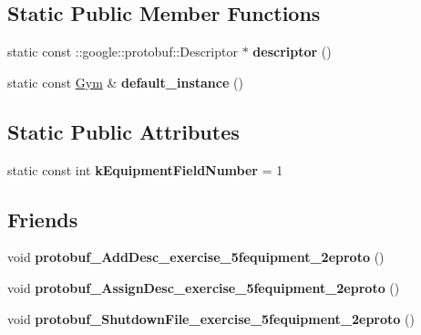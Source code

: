 \subsection*{Static Public Member Functions}
\begin{DoxyCompactItemize}
\item 
\hypertarget{classexercise__protobuf_1_1_gym_ac3a0e2edcb27d960aa09da71d74f0c43}{}static const \+::google\+::protobuf\+::\+Descriptor $\ast$ {\bfseries descriptor} ()\label{classexercise__protobuf_1_1_gym_ac3a0e2edcb27d960aa09da71d74f0c43}

\item 
\hypertarget{classexercise__protobuf_1_1_gym_a9d3d5d9ac43665f3bee33cc4ae542af3}{}static const \hyperlink{classexercise__protobuf_1_1_gym}{Gym} \& {\bfseries default\+\_\+instance} ()\label{classexercise__protobuf_1_1_gym_a9d3d5d9ac43665f3bee33cc4ae542af3}

\end{DoxyCompactItemize}
\subsection*{Static Public Attributes}
\begin{DoxyCompactItemize}
\item 
\hypertarget{classexercise__protobuf_1_1_gym_a9270b9f9ad0f94f6b18086a8f64be4a0}{}static const int {\bfseries k\+Equipment\+Field\+Number} = 1\label{classexercise__protobuf_1_1_gym_a9270b9f9ad0f94f6b18086a8f64be4a0}

\end{DoxyCompactItemize}
\subsection*{Friends}
\begin{DoxyCompactItemize}
\item 
\hypertarget{classexercise__protobuf_1_1_gym_ab643513d59abee7e930172a51104e178}{}void {\bfseries protobuf\+\_\+\+Add\+Desc\+\_\+exercise\+\_\+5fequipment\+\_\+2eproto} ()\label{classexercise__protobuf_1_1_gym_ab643513d59abee7e930172a51104e178}

\item 
\hypertarget{classexercise__protobuf_1_1_gym_aa2ddf289362adb3ea15b10dee7c74676}{}void {\bfseries protobuf\+\_\+\+Assign\+Desc\+\_\+exercise\+\_\+5fequipment\+\_\+2eproto} ()\label{classexercise__protobuf_1_1_gym_aa2ddf289362adb3ea15b10dee7c74676}

\item 
\hypertarget{classexercise__protobuf_1_1_gym_a04b681f62a7ad9cafa043f7d5a95e743}{}void {\bfseries protobuf\+\_\+\+Shutdown\+File\+\_\+exercise\+\_\+5fequipment\+\_\+2eproto} ()\label{classexercise__protobuf_1_1_gym_a04b681f62a7ad9cafa043f7d5a95e743}

\end{DoxyCompactItemize}


